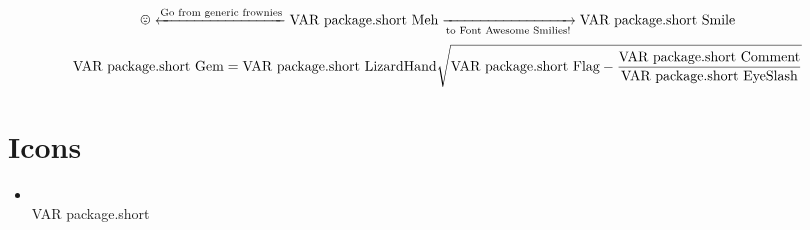 \documentclass{article}
\begin{document}
\section{}
\[
\text{\frownie} \xleftarrow{\text{Go from generic frownies}} \text{\\VAR{ package.short }Meh} 
  \xrightarrow[\text{to Font Awesome Smilies!}]{ } \text{\\VAR{ package.short }Smile}
\]
\begin{equation}
\text{\\VAR{ package.short }Gem}={\text{\\VAR{ package.short }LizardHand}}{\sqrt{\text{\\VAR{ package.short }Flag} - \frac{\text{\\VAR{ package.short }Comment}}{\text{\\VAR{ package.short }EyeSlash}}}}
\label{\\VAR{ package.short }ThumbsUp}
\end{equation}
\section{Icons}
\begin{multicols}{2}
\begin{itemize}
  \item \\VAR{ package.short } \hspace{1em} 
\end{itemize}
\end{multicols}
\end{document}
